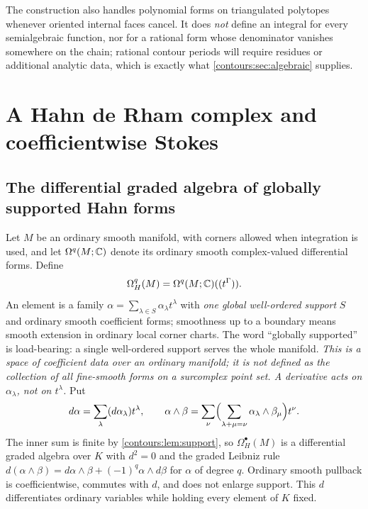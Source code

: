 \documentclass[11pt,letterpaper]{article}
\theoremstyle{definition}
\theoremstyle{remark}
\numberwithin{equation}{section}
\begin{document}
The construction also handles polynomial forms on triangulated polytopes whenever
oriented internal faces cancel. It does \emph{not} define an integral for every
semialgebraic function, nor for a rational form whose denominator vanishes
somewhere on the chain; rational contour periods will require residues or
additional analytic data, which is exactly what \cref{contours:sec:algebraic}
supplies.

\section{A Hahn de Rham complex and coefficientwise Stokes}
\label{contours:sec:derham}

\subsection{The differential graded algebra of globally supported Hahn forms}
Let $M$ be an ordinary smooth manifold, with corners allowed when integration is
used, and let $\Omega^q(M;\mathbb C)$ denote its ordinary smooth complex-valued
differential forms. Define
\begin{equation}\label{contours:eq:hahnforms}
  \Omega_H^q(M)=\Omega^q(M;\mathbb C)((t^\Gamma)).
\end{equation}
An element is a family $\alpha=\sum_{\lambda\in S}\alpha_\lambda t^\lambda$ with
\emph{one global well-ordered support} $S$ and ordinary smooth coefficient forms;
smoothness up to a boundary means smooth extension in ordinary local corner charts.
The word ``globally supported'' is load-bearing: a single well-ordered support
serves the whole manifold. \emph{This is a space of coefficient data over an
ordinary manifold; it is not defined as the collection of all fine-smooth forms on
a surcomplex point set. A derivative acts on $\alpha_\lambda$, not on $t^\lambda$.}
Put
\[
  d\alpha=\sum_\lambda(d\alpha_\lambda)t^\lambda,
  \qquad
  \alpha\wedge\beta=\sum_\nu\Bigl(\sum_{\lambda+\mu=\nu}
    \alpha_\lambda\wedge\beta_\mu\Bigr)t^\nu .
\]
The inner sum is finite by \cref{contours:lem:support}, so
$\Omega_H^\bullet(M)$ is a differential graded algebra over $K$ with $d^2=0$ and
the graded Leibniz rule
$d(\alpha\wedge\beta)=d\alpha\wedge\beta+(-1)^q\alpha\wedge d\beta$ for $\alpha$
of degree $q$. Ordinary smooth pullback is coefficientwise, commutes with $d$, and
does not enlarge support. This $d$ differentiates ordinary variables while holding
every element of $K$ fixed.
\end{document}
